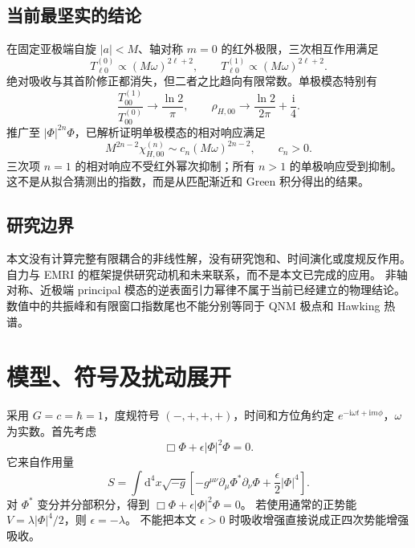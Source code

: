 \documentclass[UTF8,fontset=fandol,11pt,a4paper]{ctexart}
\newcommand{\ii}{\mathrm{i}}
\newcommand{\dd}{\mathrm{d}}
\numberwithin{equation}{section}
\begin{document}
\subsection{当前最坚实的结论}
在固定亚极端自旋 $|a|<M$、轴对称 $m=0$ 的红外极限，三次相互作用满足
\begin{equation}
T^{(0)}_{\ell0}\propto(M\omega)^{2\ell+2},\qquad
T^{(1)}_{\ell0}\propto(M\omega)^{2\ell+2}.
\end{equation}
绝对吸收与其首阶修正都消失，但二者之比趋向有限常数。单极模态特别有
\begin{equation}
\frac{T^{(1)}_{00}}{T^{(0)}_{00}}\longrightarrow\frac{\ln2}{\pi},\qquad
\rho_{H,00}\longrightarrow\frac{\ln2}{2\pi}+\frac{\ii}{4}.
\end{equation}
推广至 $|\Phi|^{2n}\Phi$，已解析证明单极模态的相对响应满足
\begin{equation}
M^{2n-2}\chi^{(n)}_{H,00}\sim c_n(M\omega)^{2n-2},\qquad c_n>0.
\end{equation}
三次项 $n=1$ 的相对响应不受红外幂次抑制；所有 $n>1$ 的单极响应受到抑制。
这不是从拟合猜测出的指数，而是从匹配渐近和 Green 积分得出的结果。

\subsection{研究边界}
本文没有计算完整有限耦合的非线性解，没有研究饱和、时间演化或度规反作用。
自力与 EMRI 的框架\cite{BarackPound2019,PoundWardell2021}提供研究动机和未来联系，而不是本文已完成的应用。
非轴对称、近极端 principal 模态的逆表面引力幂律不属于当前已经建立的物理结论。
数值中的共振峰和有限窗口指数尾也不能分别等同于 QNM 极点和 Hawking 热谱。

\section{模型、符号及扰动展开}
采用 $G=c=\hbar=1$，度规符号 $(-,+,+,+)$，时间和方位角约定
$e^{-\ii\omega t+\ii m\phi}$，$\omega$ 为实数。首先考虑
\begin{equation}\Box\Phi+\epsilon|\Phi|^2\Phi=0.\label{model}\end{equation}
它来自作用量
\begin{equation}
S=\int\dd^4x\sqrt{-g}\left[-g^{\mu\nu}\partial_\mu\Phi^*\partial_\nu\Phi
+\frac{\epsilon}{2}|\Phi|^4\right].
\end{equation}
对 $\Phi^*$ 变分并分部积分，得到 $\Box\Phi+\epsilon|\Phi|^2\Phi=0$。
若使用通常的正势能 $V=\lambda|\Phi|^4/2$，则 $\epsilon=-\lambda$。
不能把本文 $\epsilon>0$ 时吸收增强直接说成正四次势能增强吸收。
\end{document}
